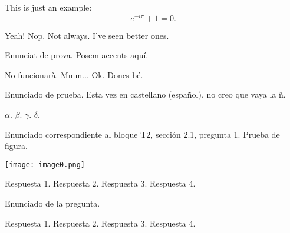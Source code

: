 This is just an example:
\begin{equation}
e^{-i\pi} + 1 = 0.
\end{equation}
\begin{enumerate}
\Myitem Yeah!
\Myitem Nop.
\Myitem Not always.
\Myitem I've seen better ones. %
\end{enumerate}

Enunciat de prova. Posem accents aquí.
\begin{enumerate}
\Myitem No funcionarà. %
\Myitem Mmm...
\Myitem Ok.
\Myitem Doncs bé.
\end{enumerate}

Enunciado de prueba. Esta vez en castellano (español), no creo que
vaya la ñ.
\begin{enumerate}
\Myitem $\alpha$. %
\Myitem $\beta$.
\Myitem $\gamma$.
\Myitem $\delta$.
\end{enumerate}

\graphicspath{{/home/jm/Escritorio/prueba/figs/}}
Enunciado correspondiente al bloque T2, sección 2.1, pregunta
1. Prueba de figura.
\begin{center}
\texttt{[image: image0.png]}
\end{center}
\begin{enumerate}
\Myitem Respuesta 1.%
\Myitem Respuesta 2.
\Myitem Respuesta 3.
\Myitem Respuesta 4.
\end{enumerate}

Enunciado de la pregunta.
\begin{enumerate}
\Myitem Respuesta 1.%
\Myitem Respuesta 2.
\Myitem Respuesta 3.
\Myitem Respuesta 4.
\end{enumerate}
